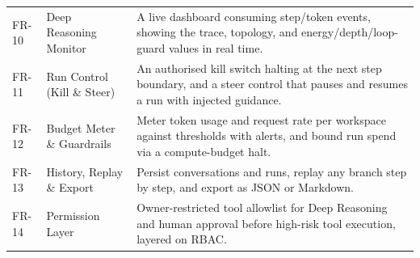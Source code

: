 \documentclass[12pt,a4paper]{report}
\begin{document}
\begin{xltabular}{\textwidth}{>{\hsize\raggedright\arraybackslash}X >{\hsize\raggedright\arraybackslash}X >{\hsize\raggedright\arraybackslash}X}
FR-10 & Deep Reasoning Monitor & A live dashboard consuming step/token events, showing the trace, topology, and energy/depth/loop-guard values in real time. \\
FR-11 & Run Control (Kill \& Steer) & An authorised kill switch halting at the next step boundary, and a steer control that pauses and resumes a run with injected guidance. \\
FR-12 & Budget Meter \& Guardrails & Meter token usage and request rate per workspace against thresholds with alerts, and bound run spend via a compute-budget halt. \\
FR-13 & History, Replay \& Export & Persist conversations and runs, replay any branch step by step, and export as JSON or Markdown. \\
FR-14 & Permission Layer & Owner-restricted tool allowlist for Deep Reasoning and human approval before high-risk tool execution, layered on RBAC. \\
\end{xltabular}
\endgroup
\end{document}
